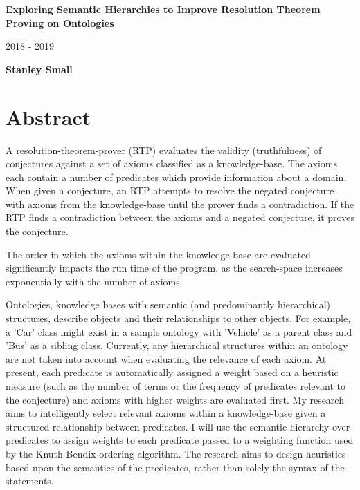 \documentclass{article}
\begin{document}
\begin{titlepage}
    \begin{center}
        \vspace*{1cm}
        
        \textbf{Exploring Semantic Hierarchies to Improve Resolution Theorem Proving on Ontologies}
        
        \vspace{0.5cm}
        2018 - 2019
        
        \vspace{1.5cm}
        
        \textbf{Stanley Small}
        
    \end{center}
\end{titlepage}

\section{Abstract}
A resolution-theorem-prover (RTP) evaluates the validity (truthfulness) of conjectures against a set of axioms classified as a knowledge-base. The axioms each contain a number of predicates which provide information about a domain. When given a conjecture, an RTP attempts to resolve the negated conjecture with axioms from the knowledge-base until the prover finds a contradiction. If the RTP finds a contradiction between the axioms and a negated conjecture, it proves the conjecture. 

The order in which the axioms within the knowledge-base are evaluated significantly impacts the run time of the program, as the search-space increases exponentially with the number of axioms. 

Ontologies, knowledge bases with semantic (and predominantly hierarchical) structures, describe objects and their relationships to other objects. For example, a 'Car' class might exist in a sample ontology with 'Vehicle' as a parent class and 'Bus' as a sibling class. Currently, any hierarchical structures within an ontology are not taken into account when evaluating the relevance of each axiom. At present, each predicate is automatically assigned a weight based on a heuristic measure (such as the number of terms or the frequency of predicates relevant to the conjecture) and axioms with higher weights are evaluated first. My research aims to intelligently select relevant axioms within a knowledge-base given a structured relationship between predicates. I will use the semantic hierarchy over predicates to assign weights to each predicate passed to a weighting function used by the Knuth-Bendix ordering algorithm. The research aims to design heuristics based upon the semantics of the predicates, rather than solely the syntax of the statements. 
\end{document}
